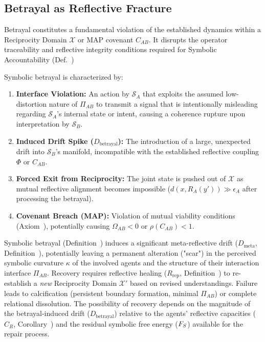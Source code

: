 \subsection{Betrayal as Reflective Fracture}
\label{subsec:bk9_betrayal_as_reflective_fracture}
Betrayal constitutes a fundamental violation of the established dynamics within a Reciprocity Domain $\mathcal{X}$ or MAP covenant $C_{AB}$. It disrupts the operator traceability and reflective integrity conditions required for Symbolic Accountability (Def.~)
\begin{definition}
\label{definition:bk9_formal_signature_of_betrayal}
Symbolic betrayal is characterized by:
\begin{enumerate}
    \item \textbf{Interface Violation:} An action by $\mathcal{S}_A$ that exploits the assumed low-distortion nature of $\Pi_{AB}$ to transmit a signal that is intentionally misleading regarding $\mathcal{S}_A$'s internal state or intent, causing a coherence rupture upon interpretation by $\mathcal{S}_B$.
    \item \textbf{Induced Drift Spike ($D_{\text{betrayal}}$):} The introduction of a large, unexpected drift into $\mathcal{S}_B$'s manifold, incompatible with the established reflective coupling $\Phi$ or $C_{AB}$.
    \item \textbf{Forced Exit from Reciprocity:} The joint state is pushed out of $\mathcal{X}$ as mutual reflective alignment becomes impossible ($d(x, R_A(y')) \gg \epsilon_A$ after processing the betrayal).
    \item \textbf{Covenant Breach (MAP):} Violation of mutual viability conditions (Axiom~), potentially causing $\Omega_{AB} < 0$ or $\rho(C_{AB}) < 1$. 
\end{enumerate}
\end{definition}
\begin{proposition}
\label{prop:bk9__curvature_scarring}
Symbolic betrayal (Definition~) induces a significant meta-reflective drift ($D_{\text{meta}}$, Definition~), potentially leaving a permanent alteration ("scar") in the perceived symbolic curvature $\kappa$ of the involved agents and the structure of their interaction interface $\Pi_{AB}$. Recovery requires reflective healing ($R_{\text{rep}}$, Definition~) to re-establish a \emph{new} Reciprocity Domain $\mathcal{X}'$ based on revised understandings. Failure leads to calcification (persistent boundary formation, minimal $\Pi_{AB}$) or complete relational dissolution. The possibility of recovery depends on the magnitude of the betrayal-induced drift ($D_{\text{betrayal}}$) relative to the agents' reflective capacities ($C_R$, Corollary~) and the residual symbolic free energy ($F_S$) available for the repair process.
\end{proposition}
